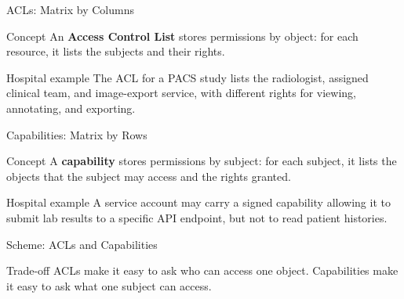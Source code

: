 \documentclass[presentation]{beamer}
\begin{document}
\begin{frame}[c]{ACLs: Matrix by Columns}
\begin{block}{Concept}
An \textbf{Access Control List} stores permissions by object: for each resource, it lists the
subjects and their rights.
\end{block}

\begin{exampleblock}{Hospital example}
The ACL for a PACS study lists the radiologist, assigned clinical team, and image-export service,
with different rights for viewing, annotating, and exporting.
\end{exampleblock}
\end{frame}

\begin{frame}[c]{Capabilities: Matrix by Rows}
\begin{block}{Concept}
A \textbf{capability} stores permissions by subject: for each subject, it lists the objects that the
subject may access and the rights granted.
\end{block}

\begin{exampleblock}{Hospital example}
A service account may carry a signed capability allowing it to submit lab results to a specific API
endpoint, but not to read patient histories.
\end{exampleblock}
\end{frame}

\begin{frame}[c]{Scheme: ACLs and Capabilities}
\begin{center}
\end{center}

\begin{block}{Trade-off}
ACLs make it easy to ask who can access one object. Capabilities make it easy to ask what one
subject can access.
\end{block}
\end{frame}
\end{document}
